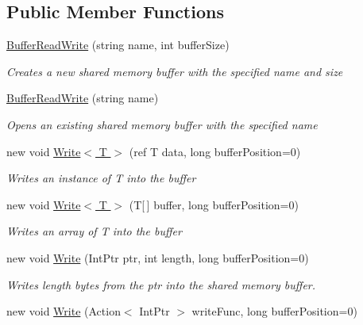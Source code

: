 \subsection*{Public Member Functions}
\begin{DoxyCompactItemize}
\item 
\hyperlink{class_shared_memory_1_1_buffer_read_write_ac672225accdac4dc8abd9d2e8a4aed30}{Buffer\+Read\+Write} (string name, int buffer\+Size)
\begin{DoxyCompactList}\small\item\em Creates a new shared memory buffer with the specified name and size \end{DoxyCompactList}\item 
\hyperlink{class_shared_memory_1_1_buffer_read_write_a64253e44bd62672502533b1644d85420}{Buffer\+Read\+Write} (string name)
\begin{DoxyCompactList}\small\item\em Opens an existing shared memory buffer with the specified name \end{DoxyCompactList}\item 
new void \hyperlink{class_shared_memory_1_1_buffer_read_write_a277110184ecebdd2d6337c5d6b52f3fa}{Write$<$ T $>$} (ref T data, long buffer\+Position=0)
\begin{DoxyCompactList}\small\item\em Writes an instance of {\itshape T}  into the buffer \end{DoxyCompactList}\item 
new void \hyperlink{class_shared_memory_1_1_buffer_read_write_a12cdb995bc498bef477b8f91355eef3f}{Write$<$ T $>$} (T\mbox{[}$\,$\mbox{]} buffer, long buffer\+Position=0)
\begin{DoxyCompactList}\small\item\em Writes an array of {\itshape T}  into the buffer \end{DoxyCompactList}\item 
new void \hyperlink{class_shared_memory_1_1_buffer_read_write_afc484df280665f9d63ae28a21e46988d}{Write} (Int\+Ptr ptr, int length, long buffer\+Position=0)
\begin{DoxyCompactList}\small\item\em Writes {\itshape length}  bytes from the {\itshape ptr}  into the shared memory buffer. \end{DoxyCompactList}\item 
new void \hyperlink{class_shared_memory_1_1_buffer_read_write_aa4ee6183b43f3bb1728f3296967e586e}{Write} (Action$<$ Int\+Ptr $>$ write\+Func, long buffer\+Position=0)

\end{DoxyCompactItemize}
